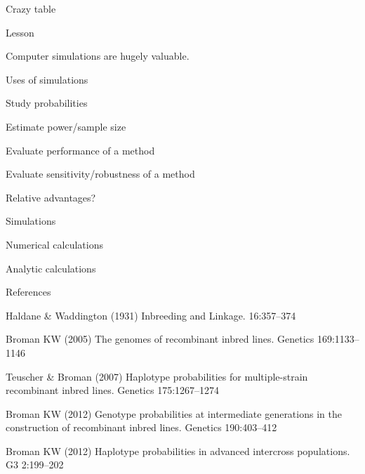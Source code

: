 \documentclass[aspectratio=169,12pt,t]{beamer}
\begin{document}
\begin{frame}[c]{Crazy table}
\end{frame}


\begin{frame}[c]{Lesson}

  \centerline{\large Computer simulations are hugely valuable.}

\end{frame}



\begin{frame}[c]{Uses of simulations}

    \bbi
    \item Study probabilities
    \item Estimate power/sample size
    \item Evaluate performance of a method
    \item Evaluate sensitivity/robustness of a method
    \ei

\end{frame}



\begin{frame}[c]{Relative advantages?}

    \bbi
    \item Simulations
    \item Numerical calculations
    \item Analytic calculations
    \ei

\end{frame}




\begin{frame}[c]{References}

  \bbi

  \item Haldane \& Waddington (1931) Inbreeding and Linkage.
    16:357--374

  \item Broman KW (2005) The genomes of recombinant inbred lines. Genetics 169:1133--1146

  \item Teuscher \& Broman (2007) Haplotype probabilities for
    multiple-strain recombinant inbred lines. Genetics 175:1267--1274

  \item Broman KW (2012) Genotype probabilities at intermediate
    generations in the construction of recombinant inbred lines.
    Genetics 190:403--412

  \item Broman KW (2012) Haplotype probabilities in advanced
    intercross populations. G3 2:199--202

  \ei

\end{frame}
\end{document}
